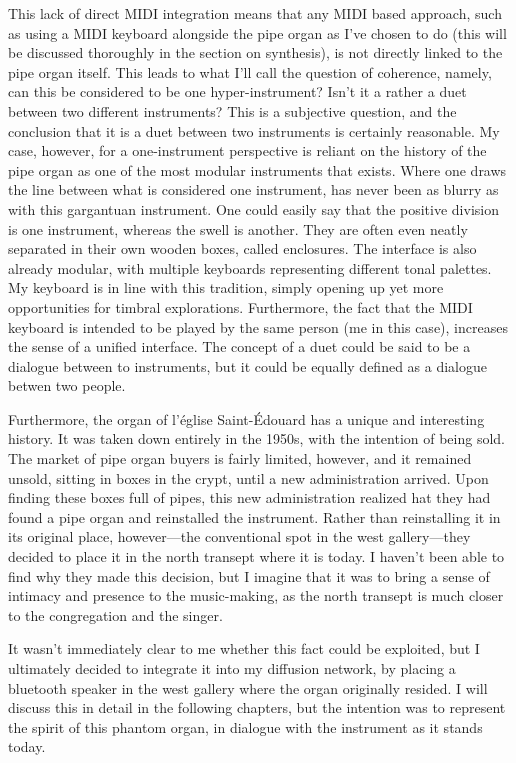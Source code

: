 \documentclass[12pt,twoside,maitrise]{dms_ks}
\theoremstyle{definition}
\begin{document}
This lack of direct MIDI integration means that any MIDI based approach, such as using a MIDI keyboard alongside the pipe organ as I've chosen to do (this will be discussed thoroughly in the section on synthesis), is not directly linked to the pipe organ itself.
This leads to what I'll call the question of coherence, namely, can this be considered to be one hyper-instrument?
Isn't it a rather a duet between two different instruments?
This is a subjective question, and the conclusion that it is a duet between two instruments is certainly reasonable.
My case, however, for a one-instrument perspective is reliant on the history of the pipe organ as one of the most modular instruments that exists.
Where one draws the line between what is considered one instrument, has never been as blurry as with this gargantuan instrument.
One could easily say that the positive division is one instrument, whereas the swell is another.
They are often even neatly separated in their own wooden boxes, called enclosures.
The interface is also already modular, with multiple keyboards representing different tonal palettes.
My keyboard is in line with this tradition, simply opening up yet more opportunities for timbral explorations.
Furthermore, the fact that the MIDI keyboard is intended to be played by the same person (me in this case), increases the sense of a unified interface.
The concept of a duet could be said to be a dialogue between to instruments, but it could be equally defined as a dialogue betwen two people.

Furthermore, the organ of l'église Saint-Édouard has a unique and interesting history. It was taken down entirely in the 1950s, with the intention of being sold. The market of pipe organ buyers is fairly limited, however, and it remained unsold, sitting in boxes in the crypt, until a new administration arrived. Upon finding these boxes full of pipes, this new administration realized hat they had found a pipe organ and reinstalled the instrument. Rather than reinstalling it in its original place, however---the conventional spot in the west gallery---they decided to place it in the north transept where it is today. I haven't been able to find why they made this decision, but I imagine that it was to bring a sense of intimacy and presence to the music-making, as the north transept is much closer to the congregation and the singer. 

It wasn't immediately clear to me whether this fact could be exploited, but I ultimately decided to integrate it into my diffusion network, by placing a bluetooth speaker in the west gallery where the organ originally resided. I will discuss this in detail in the following chapters, but the intention was to represent the spirit of this phantom organ, in dialogue with the instrument as it stands today.
\end{document}
